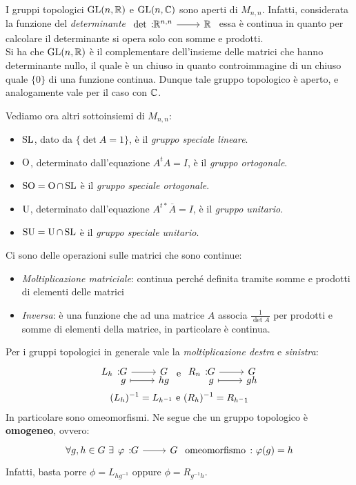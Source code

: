 \begin{observe}
	I gruppi topologici $\operatorname{GL} (n,\mathbb{R} )$ e $\operatorname{GL} (n, \mathbb{C} )$ sono aperti di $M_{n,n}$.\newline
	Infatti, considerata la funzione del \textit{determinante} $\funz \det {\realset^{n,n}} \realset$ essa è continua in quanto per calcolare il determinante si opera solo con somme e prodotti.\\
	Si ha che $\operatorname{GL}(n, \mathbb{R})$ è il complementare dell'insieme delle matrici che hanno determinante nullo, il quale è un chiuso in quanto controimmagine di un chiuso quale $\{0\}$ di una funzione continua. Dunque tale gruppo topologico è aperto, e analogamente vale per il caso con $\mathbb{C}$.
\end{observe}
Vediamo ora altri sottoinsiemi di $M_{n,n}$:
	\begin{itemize}
		\item $\operatorname{SL}$, dato da $\{\det A=1\} $, è il \textit{gruppo speciale lineare}.
		\item $\operatorname{O}$, determinato dall'equazione $A^{t}A=I$, è il \textit{gruppo ortogonale}.
		\item $\operatorname{SO}=\operatorname{O}\cap\operatorname{SL}$ è il \textit{gruppo speciale ortogonale}.
		\item $\operatorname{U}$, determinato dall'equazione $A^{t*}\overline{A}=I$, è il \textit{gruppo unitario}.
		\item $\operatorname{SU}=\operatorname{U}\cap\operatorname{SL}$ è il \textit{gruppo speciale unitario}.
	\end{itemize}
Ci sono delle operazioni sulle matrici che sono continue:
	\begin{itemize}
		\item \textit{Moltiplicazione matriciale}: continua perché definita tramite somme e prodotti di elementi delle matrici
		\item \textit{Inversa}: è una funzione che ad una matrice $A$ associa $\displaystyle \frac{1}{\det A}$ per prodotti e somme di elementi della matrice, in particolare è continua.
	\end{itemize}
\begin{observe}
	Per i gruppi topologici in generale vale la \textit{moltiplicazione destra} e \textit{sinistra}:
		\begin{gather*}
			\funztot {L_h} G G g {hg} \text{   e   } \funztot {R_n}  G G g {gh} \\
			(L_h)^{-1}=L_{h^{-1}} \text{   e   } (R_h)^{-1}=R_{h^-1}
		\end{gather*}
	In particolare sono omeomorfismi. Ne segue che un gruppo topologico è \textbf{omogeneo}, ovvero:
		\begin{gather*}
			\forall g,h\in G \ \exists \funz \phi G G \text{ omeomorfismo}\ \colon \phi(g)=h
		\end{gather*}
	Infatti, basta porre $\phi=L_{hg^{-1}}$ oppure $\phi=R_{g^{-1}h}$.
\end{observe}
